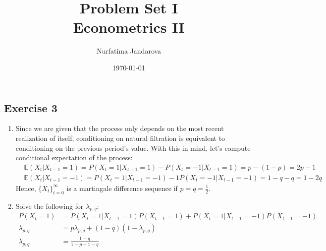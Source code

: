 \documentclass[]{article}
\title{Problem Set I \\ \large Econometrics II}
\author{Nurfatima Jandarova}
\date{\today}
\begin{document}
\maketitle

\subsection*{Exercise 3}
\begin{enumerate}[label=\alph*)]
	\item Since we are given that the process only depends on the most recent realization of itself, conditioning on natural filtration is equivalent to conditioning on the previous period's value. With this in mind, let's compute conditional expectation of the process:
	\begin{equation}
		\begin{split}
		&\mathbb{E}(X_t|X_{t-1}=1)=P(X_t=1|X_{t-1}=1)-P(X_t=-1|X_{t-1}=1)=p-(1-p)=2p-1\\ \nonumber
		&\mathbb{E}(X_t|X_{t-1}=-1)=P(X_t=1|X_{t-1}=-1)-1P(X_t=-1|X_{t-1}=-1)=1-q-q=1-2q \nonumber
		\end{split}
	\end{equation}
	Hence, $\{X_t\}_{t=0}^{\infty}$ is a martingale difference sequence if $p=q=\frac{1}{2}$.
	
	\item Solve the following for $\lambda_{p,q}$:
	\begin{equation}
		\begin{split}
		P(X_t=1)& = P(X_t=1|X_{t-1}=1)P(X_{t-1}=1) + P(X_t=1|X_{t-1}=-1)P(X_{t-1}=-1) \\ \nonumber
		\lambda_{p,q}& = p\lambda_{p,q} + (1-q)(1-\lambda_{p,q}) \\
		\lambda_{p,q}& = \frac{1-q}{1-p+1-q}
		\end{split}
	\end{equation}
	

\end{enumerate}
\end{document}
